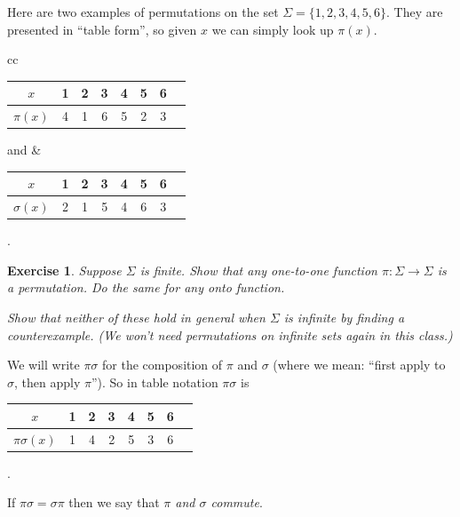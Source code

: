 \documentclass[11pt]{article}
\newtheorem{exercise}{Exercise}
\begin{document}
Here are two examples of permutations on the set $\Sigma=\{1,2,3,4,5,6\}$.
They are presented in ``table form'', so given $x$ we can simply look
up $\pi(x)$.
\begin{center}
        \begin{tabular}{cc}
            \begin{minipage}{2in}
                \begin{tabular}{c|*{7}c}
                    $x$      & 1 & 2 & 3 & 4 & 5 & 6 \\ \hline
                    $\pi(x)$ & 4 & 1 & 6 & 5 & 2 & 3
                \end{tabular}
            \end{minipage}
            and
            &
            \begin{minipage}{2in}
                \begin{tabular}{c|*{7}c}
                    $x$         & 1 & 2 & 3 & 4 & 5 & 6 \\ \hline
                    $\sigma(x)$ & 2 & 1 & 5 & 4 & 6 & 3
                \end{tabular}.
            \end{minipage}
        \end{tabular}
        \end{center}

\begin{exercise}
    Suppose $\Sigma$ is finite. Show that any one-to-one function
    $\pi:\Sigma\to\Sigma$ is a permutation. Do the same for any
    onto function.

    Show that neither of these hold in general when $\Sigma$ is infinite
    by finding a counterexample. (We won't need permutations on
    infinite sets again in this class.)
\end{exercise}

We will write $\pi\sigma$ for the composition of $\pi$ and $\sigma$ (where
we mean: ``first apply to $\sigma$, then apply $\pi$''). So in table
notation $\pi\sigma$ is
\begin{center}
    \begin{minipage}{2in}
        \begin{tabular}{c|*{7}c}
            $x$            & 1 & 2 & 3 & 4 & 5 & 6 \\ \hline
            $\pi\sigma(x)$ & 1 & 4 & 2 & 5 & 3 & 6
        \end{tabular}.
    \end{minipage}
\end{center}
If $\pi\sigma = \sigma\pi$ then we say that \emph{$\pi$ and $\sigma$ commute}.
\end{document}
